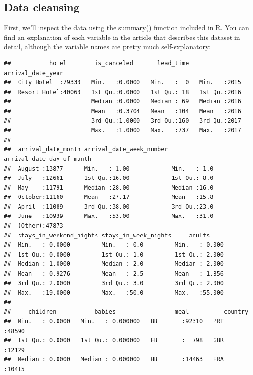 \documentclass[
]{article}
\begin{document}
\subsection{Data cleansing}\label{data-cleansing}

First, we'll inspect the data using the summary() function included in
R. You can find an explanation of each variable in the article that
describes this dataset in detail, although the variable names are pretty
much self-explanatory:

\begin{verbatim}
##           hotel        is_canceled       lead_time   arrival_date_year
##  City Hotel  :79330   Min.   :0.0000   Min.   :  0   Min.   :2015     
##  Resort Hotel:40060   1st Qu.:0.0000   1st Qu.: 18   1st Qu.:2016     
##                       Median :0.0000   Median : 69   Median :2016     
##                       Mean   :0.3704   Mean   :104   Mean   :2016     
##                       3rd Qu.:1.0000   3rd Qu.:160   3rd Qu.:2017     
##                       Max.   :1.0000   Max.   :737   Max.   :2017     
##                                                                       
##  arrival_date_month arrival_date_week_number arrival_date_day_of_month
##  August :13877      Min.   : 1.00            Min.   : 1.0             
##  July   :12661      1st Qu.:16.00            1st Qu.: 8.0             
##  May    :11791      Median :28.00            Median :16.0             
##  October:11160      Mean   :27.17            Mean   :15.8             
##  April  :11089      3rd Qu.:38.00            3rd Qu.:23.0             
##  June   :10939      Max.   :53.00            Max.   :31.0             
##  (Other):47873                                                        
##  stays_in_weekend_nights stays_in_week_nights     adults      
##  Min.   : 0.0000         Min.   : 0.0         Min.   : 0.000  
##  1st Qu.: 0.0000         1st Qu.: 1.0         1st Qu.: 2.000  
##  Median : 1.0000         Median : 2.0         Median : 2.000  
##  Mean   : 0.9276         Mean   : 2.5         Mean   : 1.856  
##  3rd Qu.: 2.0000         3rd Qu.: 3.0         3rd Qu.: 2.000  
##  Max.   :19.0000         Max.   :50.0         Max.   :55.000  
##                                                               
##     children           babies                 meal          country     
##  Min.   : 0.0000   Min.   : 0.000000   BB       :92310   PRT    :48590  
##  1st Qu.: 0.0000   1st Qu.: 0.000000   FB       :  798   GBR    :12129  
##  Median : 0.0000   Median : 0.000000   HB       :14463   FRA    :10415  

\end{verbatim}
\end{document}
